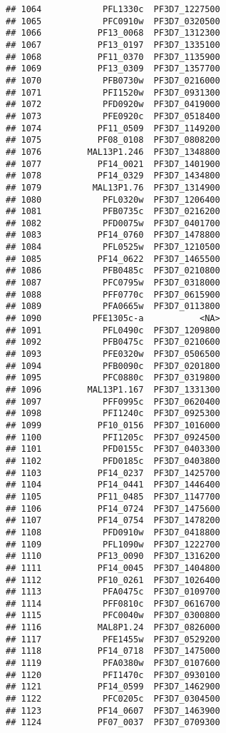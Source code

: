 \documentclass{article}\usepackage[]{graphicx}\usepackage[]{color}
\makeatletter
\newenvironment{kframe}{%
 \def\at@end@of@kframe{}%
 \ifinner\ifhmode%
  \def\at@end@of@kframe{\end{minipage}}%
  \begin{minipage}{\columnwidth}%
 \fi\fi%
 \def\FrameCommand##1{\hskip\@totalleftmargin \hskip-\fboxsep
 \colorbox{shadecolor}{##1}\hskip-\fboxsep
     \hskip-\linewidth \hskip-\@totalleftmargin \hskip\columnwidth}%
 \MakeFramed {\advance\hsize-\width
   \@totalleftmargin\z@ \linewidth\hsize
   \@setminipage}}%
 {\par\unskip\endMakeFramed%
 \at@end@of@kframe}
\newenvironment{knitrout}{}{} %
\makeatother
\begin{document}
\begin{knitrout}
\begin{kframe}
\begin{verbatim}
## 1064            PFL1330c  PF3D7_1227500
## 1065            PFC0910w  PF3D7_0320500
## 1066           PF13_0068  PF3D7_1312300
## 1067           PF13_0197  PF3D7_1335100
## 1068           PF11_0370  PF3D7_1135900
## 1069           PF13_0309  PF3D7_1357700
## 1070            PFB0730w  PF3D7_0216000
## 1071            PFI1520w  PF3D7_0931300
## 1072            PFD0920w  PF3D7_0419000
## 1073            PFE0920c  PF3D7_0518400
## 1074           PF11_0509  PF3D7_1149200
## 1075           PF08_0108  PF3D7_0808200
## 1076         MAL13P1.246  PF3D7_1348800
## 1077           PF14_0021  PF3D7_1401900
## 1078           PF14_0329  PF3D7_1434800
## 1079          MAL13P1.76  PF3D7_1314900
## 1080            PFL0320w  PF3D7_1206400
## 1081            PFB0735c  PF3D7_0216200
## 1082            PFD0075w  PF3D7_0401700
## 1083           PF14_0760  PF3D7_1478800
## 1084            PFL0525w  PF3D7_1210500
## 1085           PF14_0622  PF3D7_1465500
## 1086            PFB0485c  PF3D7_0210800
## 1087            PFC0795w  PF3D7_0318000
## 1088            PFF0770c  PF3D7_0615900
## 1089            PFA0665w  PF3D7_0113800
## 1090          PFE1305c-a           <NA>
## 1091            PFL0490c  PF3D7_1209800
## 1092            PFB0475c  PF3D7_0210600
## 1093            PFE0320w  PF3D7_0506500
## 1094            PFB0090c  PF3D7_0201800
## 1095            PFC0880c  PF3D7_0319800
## 1096         MAL13P1.167  PF3D7_1331300
## 1097            PFF0995c  PF3D7_0620400
## 1098            PFI1240c  PF3D7_0925300
## 1099           PF10_0156  PF3D7_1016000
## 1100            PFI1205c  PF3D7_0924500
## 1101            PFD0155c  PF3D7_0403300
## 1102            PFD0185c  PF3D7_0403800
## 1103           PF14_0237  PF3D7_1425700
## 1104           PF14_0441  PF3D7_1446400
## 1105           PF11_0485  PF3D7_1147700
## 1106           PF14_0724  PF3D7_1475600
## 1107           PF14_0754  PF3D7_1478200
## 1108            PFD0910w  PF3D7_0418800
## 1109            PFL1090w  PF3D7_1222700
## 1110           PF13_0090  PF3D7_1316200
## 1111           PF14_0045  PF3D7_1404800
## 1112           PF10_0261  PF3D7_1026400
## 1113            PFA0475c  PF3D7_0109700
## 1114            PFF0810c  PF3D7_0616700
## 1115            PFC0040w  PF3D7_0300800
## 1116           MAL8P1.24  PF3D7_0826000
## 1117            PFE1455w  PF3D7_0529200
## 1118           PF14_0718  PF3D7_1475000
## 1119            PFA0380w  PF3D7_0107600
## 1120            PFI1470c  PF3D7_0930100
## 1121           PF14_0599  PF3D7_1462900
## 1122            PFC0205c  PF3D7_0304500
## 1123           PF14_0607  PF3D7_1463900
## 1124           PF07_0037  PF3D7_0709300

\end{verbatim}
\end{kframe}
\end{knitrout}
\end{document}
